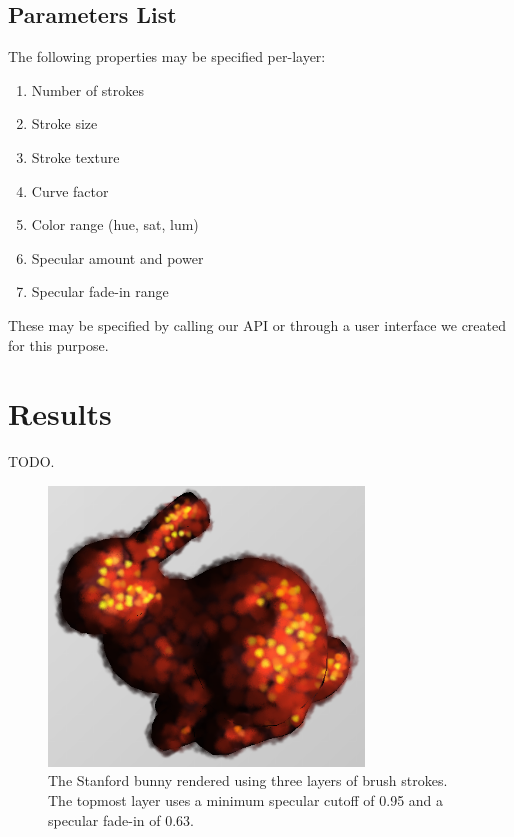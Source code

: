 \documentclass[conference]{acmsiggraph}
\begin{document}
\subsection{Parameters List}

The following properties may be specified per-layer:

\begin{enumerate}
  \item Number of strokes
  \item Stroke size
  \item Stroke texture
  \item Curve factor
  \item Color range (hue, sat, lum)
  \item Specular amount and power
  \item Specular fade-in range
\end{enumerate}

These may be specified by calling our API or through a user interface we
created for this purpose.


\section{Results}

TODO.

\begin{figure}[ht]
  \centering
  \includegraphics[width=3.3in]{images/bunny_with_fade_in}
  \caption{The Stanford bunny rendered using three layers of brush strokes.
           The topmost layer uses a minimum specular cutoff of 0.95 and a
           specular fade-in of 0.63.}
\end{figure}
\end{document}
